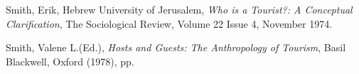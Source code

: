 \begin{thebibliography}{9}
	Smith, Erik, Hebrew University of Jerusalem,
	\emph{Who is a Tourist?: A Conceptual Clarification},
	The Sociological Review, Volume 22 Issue 4,
	November 1974.

	Smith, Valene L.(Ed.), 
	\emph{Hosts and Guests: The Anthropology of Tourism}, 
	Basil Blackwell, Oxford (1978), pp.

\end{thebibliography}